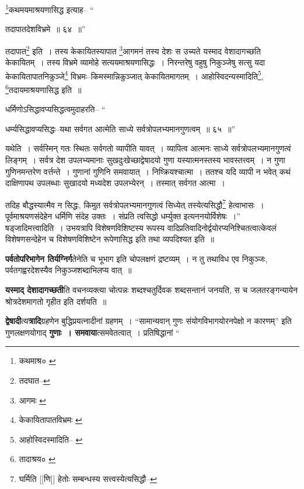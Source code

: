 \documentclass[article,12pt,a4paper]{memoir}
\begin{document}
	\footnote{कथमाश्र० \cite{dp-msA} \cite{dp-msB} \cite{dp-edP} \cite{dp-edH} \cite{dp-edE}}कथमयमाश्रयणासिद्ध इत्याह-- “
	  
	तदापातदेशविभ्रमे ॥ ६४ ॥” 
	  
	तदापात\footnote{तदघात--\cite{dp-msA}} इति । तस्य केकायितस्यापात \footnote{आगमः \cite{dp-msC}}आगमनं तस्य देशः स उच्यते यस्माद वेशादागच्छति केकायितम् । तस्य विभ्रमे व्यामोहे सत्ययमाश्रयणासिद्धः । निरन्तरेषु वहुषु निकुञ्जेषु सत्सु यदा केकायितापातनिकुञ्जे\footnote{केकायितापातविभ्रमः \cite{dp-msA} \cite{dp-edP} \cite{dp-edH}} विभ्रमः--किमस्मान्निकुञ्जात् केकायितमागतम् । आहोस्विदन्यस्मादिति\footnote{आहोस्विदस्मादिति--\cite{dp-msA} \cite{dp-edP} \cite{dp-edH} \cite{dp-edN}}, \footnote{तादाश्रय० \cite{dp-msA} \cite{dp-msB} \cite{dp-edP} \cite{dp-edH} \cite{dp-edE} \cite{dp-edN}}तदायमाश्रयणासिद्ध इति ॥ 
	  
	धर्मिणोऽसिद्धावप्यसिद्धत्वमुदाहरति-- “
	  
	धर्म्यसिद्धावप्यसिद्धः--यथा सर्वगत आत्मेति साध्ये सर्वत्रोपलभ्यमानगुणत्वम् ॥ ६५ ॥” 
	  
	यथेति । सर्वस्मिन् गतः स्थितः सर्वगतो व्यापीति यावत् । व्यापित्व आत्मनः साध्ये सर्वत्रोपलभ्यमानगुणत्वं लिङ्गम् । सर्वत्र देश उपलभ्यमानाः सुखदुःखेच्छाद्वेषादयो गुणा यस्यात्मनस्तस्य भावस्तत्त्वम् । न गुणा गुणिनमन्तरेण वर्त्तन्ते । गुणानां गुणिनि समवायात् । निष्क्रियश्चात्मा । ततश्च यदि व्यापी न भवेत् कथं दाक्षिणापथ उपलब्धाः सुखादयो मध्यदेश उपलभ्येरन् । तस्मात् सर्वगत आत्मा । 
	  
	तदिह बौद्धस्यात्मैव न सिद्धः, किमुत सर्वत्रोपलभ्यमानगुणत्वं सिध्येत् तस्येत्यसिद्धौ\footnote{घर्मिति [[णि]] हेतोः सम्बन्धस्य सत्त्वस्येत्यसिद्धौ--\cite{dp-msD-n}} हेत्वाभासः । पूर्वमाश्रयणसंदेहेन धर्मिणि संदेह उक्तः । संप्रति त्वसिद्धो धर्म्युक्त इत्यननयोर्विशेषः ।” षड्जादिमत्त्वादिति । उभयत्रापि विशेषणविशिष्टस्य रूपस्य वादिप्रतिवादिनोर्द्वयोरप्यनिश्चितत्वात्केवलं विशेषणसन्देहेन च विशेषणविशिष्टेन रूपेणासिद्ध इति तथा व्यपदिश्यत इति ॥
	\pend
      

	  \pstart \textbf{पर्वतोपरिभागेन तिर्यग्निर्ग}तेनेति च भूभाग इति चोपलक्षणं द्रष्टव्यम् । न तु तथाविध एव निकुञ्जः, पर्वतगह्वरदेशस्यैव निकुञ्जशब्दाभिलप्य वात् ॥
	\pend
      

	  \pstart \textbf{यस्माद् देशादागच्छती}ति वचनव्यक्त्या चोत्पन्नः शब्दश्चतुर्दिवक शब्दसन्तानं जनयति, स च जलतरङ्गन्यायेन श्रोत्रदेशमागतो गृहीत इति दर्शयति ॥
	\pend
      

	  \pstart \textbf{द्वेषादी}त्य\textbf{त्रादि}ग्रहणेन बुद्धिप्रयत्नादीनां ग्रहणम् । “सामान्यवान् गुणः संयोगविभागयोरनपेक्षो न कारणम्” इति गुणलक्षणयोगाद् \textbf{गुणाः । समवाया}त्समवेतत्वात् । प्रतिषिद्धानां  \leavevmode{} “
	  
\end{document}
